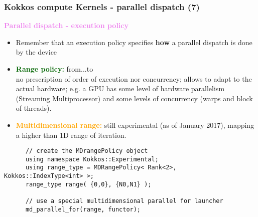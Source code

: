 \begin{frame}[fragile=singleslide]
  \frametitle{Kokkos compute Kernels - parallel dispatch (7)}
  
  {\Large \textcolor{violet}{\textbf{Parallel dispatch - execution policy}}}

  \begin{itemize}
  \item Remember that an execution policy specifies \textbf{how} a parallel dispatch is done by the device
  \item \textcolor{darkgreen}{\bf Range policy:} from...to\\
    no prescription of order of execution nor concurrency; allows to adapt to the actual hardware; e.g. a GPU has some level of hardware parallelism (Streaming Multiprocessor) and some levels of concurrency (warps and block of threads).
  \item \textcolor{orange}{\bf Multidimensional range:} still experimental (as of January 2017), mapping a higher than 1D range of iteration.
  \end{itemize}
  {\small
    \begin{verbatim}
      // create the MDrangePolicy object
      using namespace Kokkos::Experimental;
      using range_type = MDRangePolicy< Rank<2>, Kokkos::IndexType<int> >;
      range_type range( {0,0}, {N0,N1} );
      
      // use a special multidimensional parallel for launcher
      md_parallel_for(range, functor);
    \end{verbatim}
  }

\end{frame}

